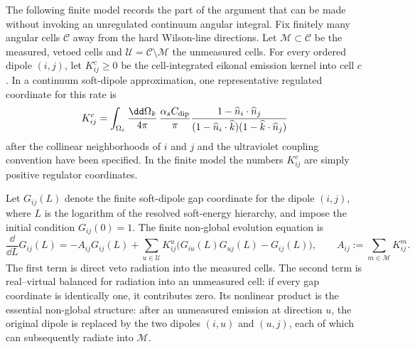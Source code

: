 The following finite model records the part of the argument that can be made
without invoking an unregulated continuum angular integral.  Fix finitely many
angular cells \(\mathcal C\) away from the hard Wilson-line directions.  Let
\(\mathcal M\subset\mathcal C\) be the measured, vetoed cells and
\(\mathcal U=\mathcal C\setminus\mathcal M\) the unmeasured cells.  For every
ordered dipole \((i,j)\), let \(K_{ij}^c\ge0\) be the cell-integrated eikonal
emission kernel into cell \(c\).  In a continuum soft-dipole approximation,
one representative regulated coordinate for this rate is
\[
  K_{ij}^c
  =
  \int_{\Omega_c}\frac{\dd\Omega_k}{4\pi}\,
  \frac{\alpha_s C_{\rm dip}}{\pi}
  \frac{1-\widehat n_i\cdot\widehat n_j}
       {(1-\widehat n_i\cdot\widehat k)
        (1-\widehat k\cdot\widehat n_j)}
\]
after the collinear neighborhoods of \(i\) and \(j\) and the ultraviolet
coupling convention have been specified.  In the finite model the numbers
\(K_{ij}^c\) are simply positive regulator coordinates.

Let \(G_{ij}(L)\) denote the finite soft-dipole gap coordinate for the dipole
\((i,j)\), where \(L\) is the logarithm of the resolved soft-energy hierarchy,
and impose the initial condition \(G_{ij}(0)=1\).  The finite non-global
evolution equation is
\begin{equation}
  \frac{\dd}{\dd L}G_{ij}(L)
  =
  -A_{ij}G_{ij}(L)
  +
  \sum_{u\in\mathcal U}
  K_{ij}^{u}
  \bigl(G_{iu}(L)G_{uj}(L)-G_{ij}(L)\bigr),
  \qquad
  A_{ij}:=\sum_{m\in\mathcal M}K_{ij}^{m}.
  \label{eq:finite-non-global-dipole-evolution}
\end{equation}
The first term is direct veto radiation into the measured cells.  The second
term is real--virtual balanced for radiation into an unmeasured cell: if every
gap coordinate is identically one, it contributes zero.  Its nonlinear
product is the essential non-global structure: after an unmeasured emission
at direction \(u\), the original dipole is replaced by the two dipoles
\((i,u)\) and \((u,j)\), each of which can subsequently radiate into
\(\mathcal M\).

